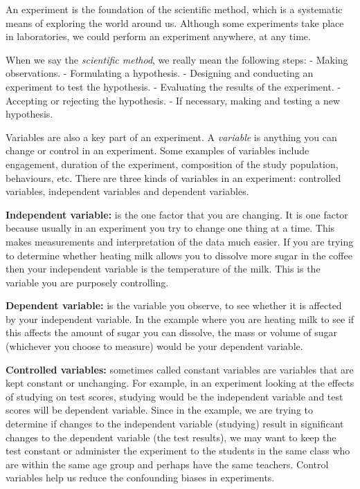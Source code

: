\documentclass[openany]{book}
\begin{document}
An experiment is the foundation of the scientific method, which is a systematic means of exploring the world around us. Although some experiments take place in laboratories, we could perform an experiment anywhere, at any time.

When we say the \emph{scientific method}, we really mean the following steps:
- Making observations.
- Formulating a hypothesis.
- Designing and conducting an experiment to test the hypothesis.
- Evaluating the results of the experiment.
- Accepting or rejecting the hypothesis.
- If necessary, making and testing a new hypothesis.

Variables are also a key part of an experiment. A \emph{variable} is anything you can change or control in an experiment. Some examples of variables include engagement, duration of the experiment, composition of the study population, behaviours, etc. There are three kinds of variables in an experiment: controlled variables, independent variables and dependent variables.

\textbf{Independent variable:} is the one factor that you are changing. It is one factor because usually in an experiment you try to change one thing at a time. This makes measurements and interpretation of the data much easier. If you are trying to determine whether heating milk allows you to dissolve more sugar in the coffee then your independent variable is the temperature of the milk. This is the variable you are purposely controlling.

\textbf{Dependent variable:} is the variable you observe, to see whether it is affected by your independent variable. In the example where you are heating milk to see if this affects the amount of sugar you can dissolve, the mass or volume of sugar (whichever you choose to measure) would be your dependent variable.

\textbf{Controlled variables:} sometimes called constant variables are variables that are kept constant or unchanging. For example, in an experiment looking at the effects of studying on test scores, studying would be the independent variable and test scores will be dependent variable. Since in the example, we are trying to determine if changes to the independent variable (studying) result in significant changes to the dependent variable (the test results), we may want to keep the test constant or administer the experiment to the students in the same class who are within the same age group and perhaps have the same teachers. Control variables help us reduce the confounding biases in experiments.
\end{document}
